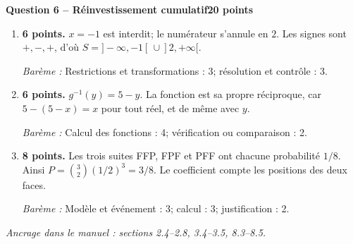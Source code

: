 \documentclass[11pt,a4paper]{article}
\begin{document}
\newpage
{\large\bfseries Question 6 -- Réinvestissement cumulatif}\hfill\textbf{20 points}\par
\begin{enumerate}
\item \textbf{6 points.} \(x=-1\) est interdit; le numérateur s’annule en \(2\). Les signes sont \(+, -, +\), d’où \(S=]-\infty,-1[\,\cup]2,+\infty[\).
\par{\small\textit{Barème : }Restrictions et transformations : 3; résolution et contrôle : 3.}
\item \textbf{6 points.} \(g^{-1}(y)=5-y\). La fonction est sa propre réciproque, car \(5-(5-x)=x\) pour tout réel, et de même avec \(y\).
\par{\small\textit{Barème : }Calcul des fonctions : 4; vérification ou comparaison : 2.}
\item \textbf{8 points.} Les trois suites FFP, FPF et PFF ont chacune probabilité \(1/8\). Ainsi \(P=\binom32(1/2)^3=3/8\). Le coefficient compte les positions des deux faces.
\par{\small\textit{Barème : }Modèle et événement : 3; calcul : 3; justification : 2.}
\end{enumerate}
\vfill {\small\textit{Ancrage dans le manuel : sections 2.4--2.8, 3.4--3.5, 8.3--8.5.}}
\end{document}
